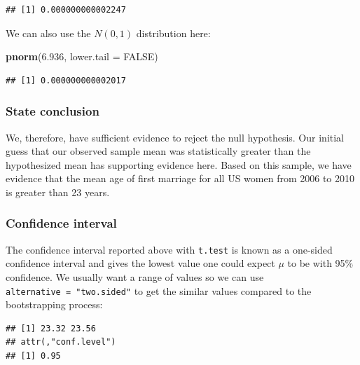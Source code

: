 \documentclass[]{tufte-book}
\newenvironment{Shaded}{\begin{snugshade}}{\end{snugshade}}
\newcommand{\KeywordTok}[1]{\textcolor[rgb]{0.13,0.29,0.53}{\textbf{{#1}}}}
\newcommand{\DataTypeTok}[1]{\textcolor[rgb]{0.13,0.29,0.53}{{#1}}}
\newcommand{\DecValTok}[1]{\textcolor[rgb]{0.00,0.00,0.81}{{#1}}}
\newcommand{\FloatTok}[1]{\textcolor[rgb]{0.00,0.00,0.81}{{#1}}}
\newcommand{\StringTok}[1]{\textcolor[rgb]{0.31,0.60,0.02}{{#1}}}
\newcommand{\OtherTok}[1]{\textcolor[rgb]{0.56,0.35,0.01}{{#1}}}
\newcommand{\NormalTok}[1]{{#1}}
\begin{document}
\begin{verbatim}
## [1] 0.000000000002247
\end{verbatim}

We can also use the \(N(0, 1)\) distribution here:

\begin{Shaded}
\begin{Highlighting}[]
\KeywordTok{pnorm}\NormalTok{(}\FloatTok{6.936}\NormalTok{, }\DataTypeTok{lower.tail =} \OtherTok{FALSE}\NormalTok{)}
\end{Highlighting}
\end{Shaded}

\begin{verbatim}
## [1] 0.000000000002017
\end{verbatim}

\subsubsection{State conclusion}\label{state-conclusion}

We, therefore, have sufficient evidence to reject the null hypothesis.
Our initial guess that our observed sample mean was statistically
greater than the hypothesized mean has supporting evidence here. Based
on this sample, we have evidence that the mean age of first marriage for
all US women from 2006 to 2010 is greater than 23 years.

\subsubsection{Confidence interval}\label{confidence-interval}

The confidence interval reported above with \texttt{t.test} is known as
a one-sided confidence interval and gives the lowest value one could
expect \(\mu\) to be with 95\% confidence. We usually want a range of
values so we can use \texttt{alternative\ =\ "two.sided"} to get the
similar values compared to the bootstrapping process:

\begin{Shaded}
\end{Shaded}

\begin{verbatim}
## [1] 23.32 23.56
## attr(,"conf.level")
## [1] 0.95
\end{verbatim}
\end{document}
